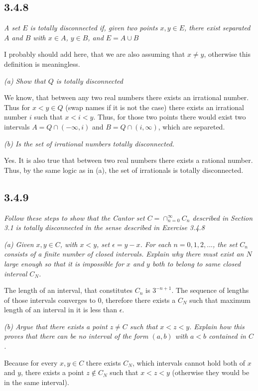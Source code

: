 \documentclass[11pt,oneside,titlepage]{book}
\begin{document}
\subsection*{3.4.8}
\textit{A set $E$ is totally disconnected if, given two points $x, y \in E$,
  there exist separated $A$ and $B$  with $x \in A$, $y \in B$, and
  $E = A \cup B$}

I probably should add here, that we are also assuming that $x \neq y$,
otherwise this definition is meaningless.

\textit{(a) Show that $Q$ is totally disconnected}

We know, that between any two real numbers there exists an irrational number.
Thus for $x < y \in Q$ (swap names if it is not the case) there exists
an irrational number $i$ such that $x < i < y$. Thus, for those two points
there would exist two intervals $A = Q \cap (-\infty, i)$ and $B = Q \cap (i, \infty)$, which are separeted.

\textit{(b) Is the set of irrational numbers totally disconnected.}

Yes. It is also true that between two real numbers there exists a rational
number. Thus, by the same logic as in (a), the set of irrationals is totally
disconnected.

\subsection*{3.4.9}
\textit{Follow these steps to show that the Cantor set
  $C = \cap_{n = 0}^{\infty} C_n $ described in Section 3.1 is totally
  disconnected in the sense described in Exercise 3.4.8}

\textit{(a) Given $x, y \in C$, with $x < y$, set $\epsilon = y - x$. For
  each $n = 0, 1, 2,...$, the set $C_n$ consists of a finite number of closed
  intervals. Explain why there must exist an $N$ large enough so that it is
  impossible for $x$ and $y$ both to belong to same closed interval $C_N$.}

The length of an interval, that constitutes $C_n$ is $3^{-n + 1}$. The sequence
of lengths of those intervals converges to 0, therefore there exists
a $C_N$ such that maximum length of an interval in it is less than $\epsilon$.

\textit{(b) Argue that there exists a point $z \neq C$ such that $x < z < y$.
  Explain how this proves that there can be no interval of the form $(a,b)$
  with $a < b$ contained in $C$.}

Because for every $x, y \in C$ there exists $C_N$,
which intervals  cannot hold both
of $x$ and $y$, there exists a point $z \notin C_N$ such that $x < z < y$
(otherwise they would be in the same interval).
\end{document}
